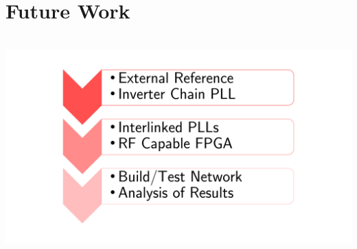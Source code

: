 \documentclass{beamer}
\begin{document}
\section*{Future Work}
\begin{frame}
\frametitle{\insertsection}\framesubtitle{\insertsubsection}
	\begin{center}
		\vspace{-14mm}
		\begin{columns}
		\includegraphics[scale=0.4]{Timeline.pdf}
		\end{columns}
	\end{center}

\end{frame}
\end{document}
